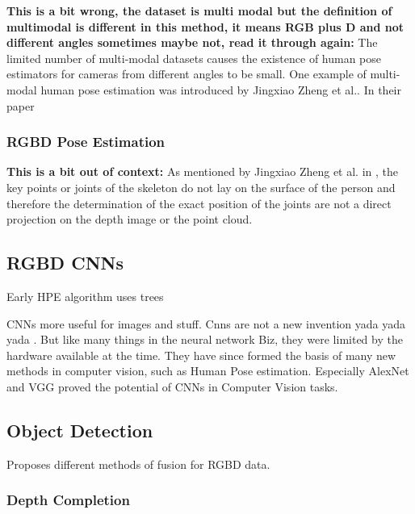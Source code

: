\textbf{This is a bit wrong, the dataset is multi modal but the definition of multimodal is different in this method, it means RGB plus D and not different angles sometimes maybe not, read it through again:}
The limited number of multi-modal datasets causes the existence of human pose estimators for cameras from different angles to be small. One example of multi-modal human pose estimation was introduced by Jingxiao Zheng et al.\cite{MultiModalHPERGBD}. In their paper 

\subsubsection{RGBD Pose Estimation}

\textbf{This is a bit out of context:}
As mentioned by Jingxiao Zheng et al. in \cite{MultiModalHPERGBD}, the key points or joints of the skeleton do not lay on the surface of the person and therefore the determination of the exact position of the joints are not a direct projection on the depth image or the point cloud.

\cite{PASCUALHERNANDEZ2022102225}

\cite{RGBDHPEforRoboticTaskLearning}




\subsection{RGBD CNNs}

Early HPE algorithm uses trees \cite{EarlyRGBDHPE}

CNNs more useful for images and stuff. Cnns are not a new invention yada yada yada \cite{OldCNN}. But like many things in the neural network Biz, they were limited by the hardware available at the time. They have since formed the basis of many new methods in computer vision, such as Human Pose estimation. Especially AlexNet \cite{AlexNet} and VGG \cite{VGG} proved the potential of CNNs in Computer Vision tasks. 

\subsection{Object Detection}

\cite{Chen2021} Proposes different methods of fusion for RGBD data.

\subsubsection{Depth Completion}


